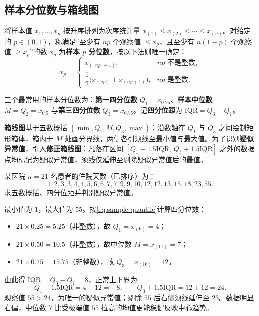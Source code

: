 \subsection{样本分位数与箱线图}

\begin{definition}[样本 $p$ 分位数]
\label{def:sample-quantile}
将样本值 $x_1,\ldots,x_n$ 按升序排列为次序统计量 $x_{(1)}\le x_{(2)}\le\cdots\le x_{(n)}$。对给定的 $p\in(0,1)$，称满足“至少有 $np$ 个观察值 $\le x_p$，且至少有 $n(1-p)$ 个观察值 $\ge x_p$”的数 $x_p$ 为\textbf{样本 $p$ 分位数}，按以下法则唯一确定：
\begin{equation}
  x_p=
  \begin{cases}
    x_{(\lfloor np\rfloor+1)},& np\text{ 不是整数},\\[4pt]
    \dfrac{1}{2}\bigl(x_{(np)}+x_{(np+1)}\bigr),& np\text{ 是整数}.
  \end{cases}
  \label{eq:sample-quantile}
\end{equation}
\end{definition}

三个最常用的样本分位数为：\textbf{第一四分位数} $Q_1=x_{0.25}$、\textbf{样本中位数} $M=Q_2=x_{0.5}$ 与\textbf{第三四分位数} $Q_3=x_{0.75}$。记\textbf{四分位距}为 $\mathrm{IQR}=Q_3-Q_1$。

\textbf{箱线图}基于五数概括 $(\min,Q_1,M,Q_3,\max)$：沿数轴在 $Q_1$ 与 $Q_3$ 之间绘制矩形箱体，箱内于 $M$ 处画分界线，两侧各引须线至最小值与最大值。为了识别\textbf{疑似异常值}，引入\textbf{修正箱线图}：凡落在区间 $[Q_1-1.5\mathrm{IQR},\,Q_3+1.5\mathrm{IQR}]$ 之外的数据点均标记为疑似异常值，须线仅延伸至剔除疑似异常值后的最值。

\begin{example}[title={样本分位数与修正箱线图异常值检测}]
\label{eg:boxplot-outlier}
某医院 $n=21$ 名患者的住院天数（已排序）为：
\[
  1,2,3,3,4,4,5,6,6,7,7,9,9,10,12,12,13,15,18,23,55.
\]
求五数概括、四分位距并判别疑似异常值。
\begin{solution}
最小值为 $1$，最大值为 $55$。按\eqref{eq:sample-quantile}计算四分位数：
\begin{itemize}
  \item $21\times 0.25=5.25$（非整数），故 $Q_1=x_{(6)}=4$；
  \item $21\times 0.50=10.5$（非整数），故中位数 $M=x_{(11)}=7$；
  \item $21\times 0.75=15.75$（非整数），故 $Q_3=x_{(16)}=12$。
\end{itemize}
由此得 $\mathrm{IQR}=Q_3-Q_1=8$，正常上下界为
\[
  Q_1-1.5\mathrm{IQR}=4-12=-8,\qquad Q_3+1.5\mathrm{IQR}=12+12=24.
\]
观察值 $55>24$，为唯一的疑似异常值；剔除 $55$ 后右侧须线延伸至 $23$。数据明显右偏，中位数 $7$ 比受极端值 $55$ 拉高的均值更能稳健反映中心趋势。
\end{solution}
\end{example}

